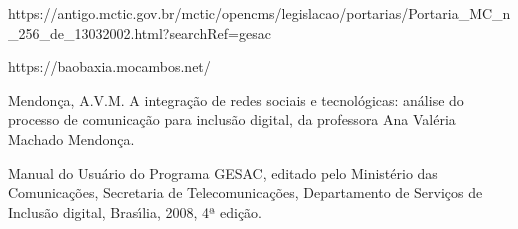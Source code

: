 \documentclass[
12pt,		%
openright,	%
twoside,  %
a4paper,			%
chapter=TITLE,		%
english,			%
french,				%
spanish,			%
brazil				%
]{USPSC-classe/USPSC}
\begin{document}
\begin{flushleft}
\begin{flushleft}
\begin{flushleft}
\begin{flushleft}
[BRASIL, 2002] https://antigo.mctic.gov.br/mctic/opencms/legislacao/portarias/Portaria\_MC\_n\_256\_de\_13032002.html?searchRef=gesac
\end{flushleft}


\end{flushleft}


\end{flushleft}


\end{flushleft}


\begin{flushleft}
\begin{flushleft}
\begin{flushleft}
\begin{flushleft}
[BAOBAXIA, 2003] https://baobaxia.mocambos.net/
\end{flushleft}


\end{flushleft}


\end{flushleft}


\end{flushleft}


\begin{flushleft}
\begin{flushleft}
\begin{flushleft}
\begin{flushleft}
[MENDON\c{C}A, 2015] Mendon\c{c}a, A.V.M. A integra\c{c}\~ao de redes sociais e tecnol\'ogicas: an\'alise do processo de comunica\c{c}\~ao para inclus\~ao digital, da professora Ana Val\'eria  Machado  Mendon\c{c}a.
\end{flushleft}


\end{flushleft}


\end{flushleft}


\end{flushleft}


\begin{flushleft}
\begin{flushleft}
\begin{flushleft}
\begin{flushleft}
[MC, 2008] Manual do Usu\'ario do Programa GESAC, editado pelo Minist\'erio das Comunica\c{c}\~oes, Secretaria de Telecomunica\c{c}\~oes, Departamento de Servi\c{c}os de Inclus\~ao digital,  Bras\'{\i}lia, 2008, 4ª edi\c{c}\~ao.
\end{flushleft}


\end{flushleft}


\end{flushleft}


\end{flushleft}
\end{document}
